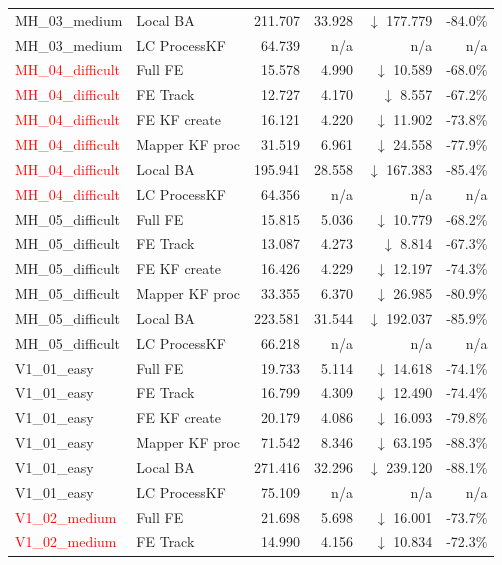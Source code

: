 \documentclass[11pt]{article}
\begin{document}
\begin{longtable}{llrrrr}
MH\_03\_medium & Local BA & 211.707 & 33.928 & $\downarrow$ 177.779 & -84.0\% \\
MH\_03\_medium & LC ProcessKF & 64.739 & n/a & n/a & n/a \\
\textcolor{red}{MH\_04\_difficult} & Full FE & 15.578 & 4.990 & $\downarrow$ 10.589 & -68.0\% \\
\textcolor{red}{MH\_04\_difficult} & FE Track & 12.727 & 4.170 & $\downarrow$ 8.557 & -67.2\% \\
\textcolor{red}{MH\_04\_difficult} & FE KF create & 16.121 & 4.220 & $\downarrow$ 11.902 & -73.8\% \\
\textcolor{red}{MH\_04\_difficult} & Mapper KF proc & 31.519 & 6.961 & $\downarrow$ 24.558 & -77.9\% \\
\textcolor{red}{MH\_04\_difficult} & Local BA & 195.941 & 28.558 & $\downarrow$ 167.383 & -85.4\% \\
\textcolor{red}{MH\_04\_difficult} & LC ProcessKF & 64.356 & n/a & n/a & n/a \\
MH\_05\_difficult & Full FE & 15.815 & 5.036 & $\downarrow$ 10.779 & -68.2\% \\
MH\_05\_difficult & FE Track & 13.087 & 4.273 & $\downarrow$ 8.814 & -67.3\% \\
MH\_05\_difficult & FE KF create & 16.426 & 4.229 & $\downarrow$ 12.197 & -74.3\% \\
MH\_05\_difficult & Mapper KF proc & 33.355 & 6.370 & $\downarrow$ 26.985 & -80.9\% \\
MH\_05\_difficult & Local BA & 223.581 & 31.544 & $\downarrow$ 192.037 & -85.9\% \\
MH\_05\_difficult & LC ProcessKF & 66.218 & n/a & n/a & n/a \\
V1\_01\_easy & Full FE & 19.733 & 5.114 & $\downarrow$ 14.618 & -74.1\% \\
V1\_01\_easy & FE Track & 16.799 & 4.309 & $\downarrow$ 12.490 & -74.4\% \\
V1\_01\_easy & FE KF create & 20.179 & 4.086 & $\downarrow$ 16.093 & -79.8\% \\
V1\_01\_easy & Mapper KF proc & 71.542 & 8.346 & $\downarrow$ 63.195 & -88.3\% \\
V1\_01\_easy & Local BA & 271.416 & 32.296 & $\downarrow$ 239.120 & -88.1\% \\
V1\_01\_easy & LC ProcessKF & 75.109 & n/a & n/a & n/a \\
\textcolor{red}{V1\_02\_medium} & Full FE & 21.698 & 5.698 & $\downarrow$ 16.001 & -73.7\% \\
\textcolor{red}{V1\_02\_medium} & FE Track & 14.990 & 4.156 & $\downarrow$ 10.834 & -72.3\% \\

\end{longtable}
\end{document}
